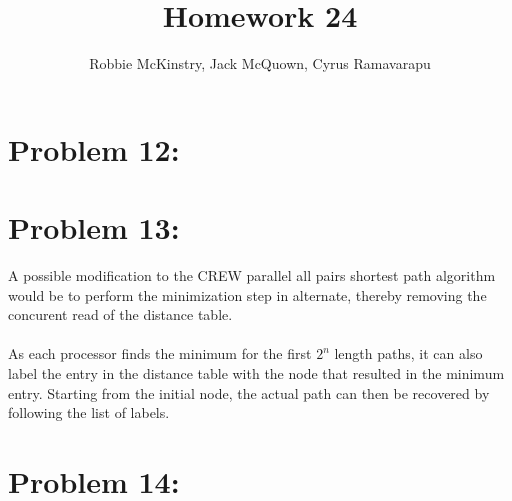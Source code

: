 \documentclass[12pt]{article}
\begin{document}
\title{Homework 24}
\author{Robbie McKinstry, Jack McQuown, Cyrus Ramavarapu}
\renewcommand{\today}{27 October 2016}
\renewcommand{\baselinestretch}{1.5}
\maketitle

\section*{Problem 12: }
\section*{Problem 13: }
A possible modification to the CREW parallel all pairs shortest
path algorithm would be to perform the minimization step in 
alternate, thereby removing the concurent read of the distance
table.\\\\
As each processor finds the minimum for the first $2^n$ length
paths, it can also label the entry in the distance table with the
node that resulted in the minimum entry.  Starting from the initial
node, the actual path can then be recovered by following the 
list of labels.
\section*{Problem 14: }
\end{document}
